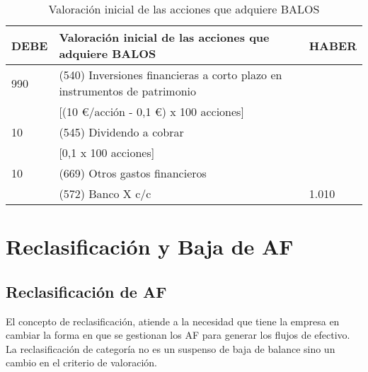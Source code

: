 \begin{table}[H]
    \centering
    \begin{tabular}{|p{3cm}|p{6cm}|p{3cm}|}
    \hline
    \rowcolor{blue!30}
    \textbf{DEBE} & \textbf{Valoración inicial de las acciones que adquiere BALOS} & \textbf{HABER} \\
    \hline
    990 & (540) Inversiones financieras a corto plazo en instrumentos de patrimonio & \\
    & [(10 €/acción - 0,1 €) x 100 acciones] & \\
    \hline
    10 & (545) Dividendo a cobrar & \\
    & [0,1 x 100 acciones] & \\
    \hline
    10 & (669) Otros gastos financieros & \\
    \hline
    & (572) Banco X c/c & 1.010 \\
    \hline
    \end{tabular}
    \caption{Valoración inicial de las acciones que adquiere BALOS}
    \label{tab:valoracion_inicial_bal}
\end{table}

\newpage 
\section{Reclasificación y Baja de AF}

\subsection{Reclasificación de AF}

El concepto de reclasificación, atiende a la necesidad que tiene la empresa en cambiar la forma en que se gestionan los AF para generar los flujos de efectivo. La reclasificación de categoría no es un suspenso de baja de balance sino un cambio en el criterio de valoración.

